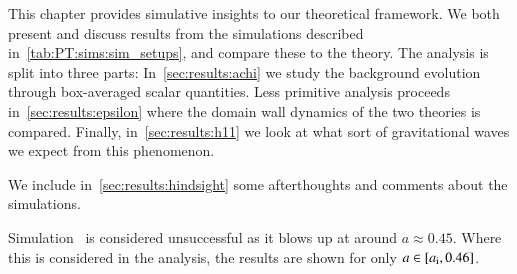 


\newcommand{\lbl}[1]{\textsf{\textbf{#1}}}
\newcommand{\completelbl}[4]{%
\textbf{#1)}%
\textbf{#2:}%
\lbl{#3.#4}%
}
\newcommand{\lcoord}{\ALIASlcoord}
\newcommand{\lcoordx}{\ALIASlcoordx}
\newcommand{\lcoordk}{\ALIASlcoordk}
\newcommand{\epsA}{\ALIASepsA}
\newcommand{\epsB}{\ALIASepsB}
\newcommand{\epsC}{\ALIASepsC}









This chapter provides simulative insights to our theoretical framework. We both present and discuss results from the simulations described in~\cref{tab:PT:sims:sim_setups}, and compare these to the theory. The analysis is split into three parts: In~\cref{sec:results:achi} we study the background evolution through box-averaged scalar quantities. Less primitive analysis proceeds in~\cref{sec:results:epsilon} where the domain wall dynamics of the two theories is compared. Finally, in~\cref{sec:results:h11} we look at what sort of gravitational waves we expect from this phenomenon. 

We include in~\cref{sec:results:hindsight} some afterthoughts and comments about the simulations. 



Simulation~ is considered unsuccessful as it blows up at around $a\approx 0.45$. Where this is considered in the analysis, the results are shown for only $a\in [a_\mathrm{i}, 0.46]$. 







